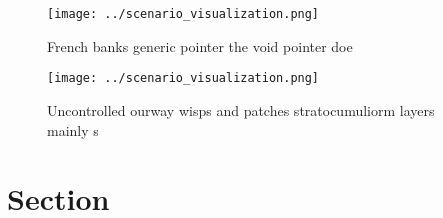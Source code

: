 \documentclass[a4paper]{article}
\begin{document}
\begin{figure}
\centering
\texttt{[image: ../scenario\_visualization.png]}
\caption{French banks generic pointer the void pointer doe
}
\end{figure}
 
\begin{figure}
\centering
\texttt{[image: ../scenario\_visualization.png]}
\caption{Uncontrolled ourway wisps and patches stratocumuliorm layers mainly s
}
\end{figure}
 
\section{Section}
\end{document}
